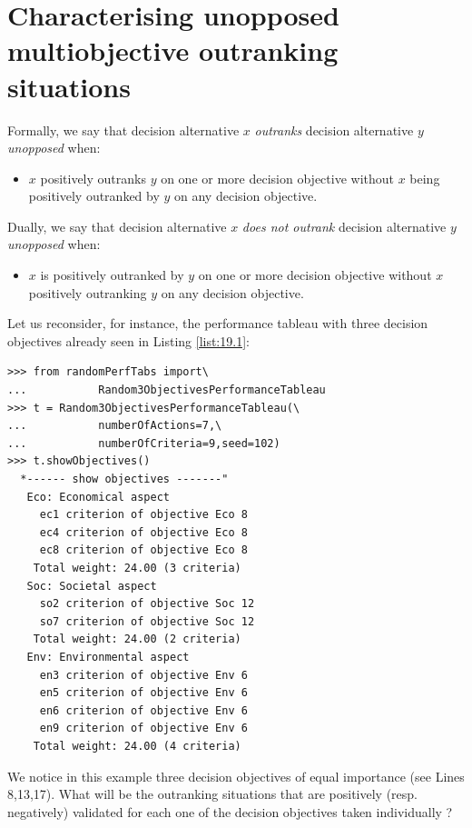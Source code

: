 \section[Unopposed outranking situations]{Characterising unopposed multiobjective outranking situations}
\label{sec:19.5}

Formally, we say that decision alternative $x$ \emph{outranks} decision alternative $y$ \emph{unopposed} when:
\begin{itemize}
\item [] $x$ positively outranks $y$ on one or more decision objective without $x$ being positively outranked by $y$ on any decision objective.
\end{itemize}
Dually, we say that decision alternative $x$ \emph{does not outrank} decision alternative $y$ \emph{unopposed} when:
\begin{itemize}
\item [] $x$ is positively outranked by $y$ on one or more decision objective without $x$ positively outranking $y$ on any decision objective.
\end{itemize}

Let us reconsider, for instance, the performance tableau with three decision objectives already seen in Listing \ref{list:19.1}:
\begin{lstlisting}
>>> from randomPerfTabs import\
...           Random3ObjectivesPerformanceTableau
>>> t = Random3ObjectivesPerformanceTableau(\
...           numberOfActions=7,\
...           numberOfCriteria=9,seed=102)
>>> t.showObjectives()
  *------ show objectives -------"
   Eco: Economical aspect
     ec1 criterion of objective Eco 8
     ec4 criterion of objective Eco 8
     ec8 criterion of objective Eco 8
    Total weight: 24.00 (3 criteria)
   Soc: Societal aspect
     so2 criterion of objective Soc 12
     so7 criterion of objective Soc 12
    Total weight: 24.00 (2 criteria)
   Env: Environmental aspect
     en3 criterion of objective Env 6
     en5 criterion of objective Env 6
     en6 criterion of objective Env 6
     en9 criterion of objective Env 6
    Total weight: 24.00 (4 criteria)
\end{lstlisting}
We notice in this example three decision objectives of equal importance (see Lines 8,13,17). What will be the outranking situations that are positively (resp.  negatively) validated for each one of the decision objectives taken individually ?

